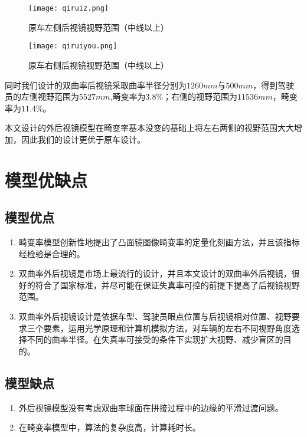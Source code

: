 \documentclass[withoutpreface,bwprint]{cumcmthesis} %
\begin{document}
\begin{figure}[!htbp]  
\begin{minipage}[t]{0.5\textwidth}
\centering  
\texttt{[image: qiruiz.png]}
\caption{原车左侧后视镜视野范围（中线以上）} \label{fig:qiruiz}\end{minipage}
\hspace{1ex}
\begin{minipage}[t]{0.5\textwidth}  
\centering  
\texttt{[image: qiruiyou.png]}
\caption{原车右侧后视镜视野范围（中线以上）} \label{fig:qiruiy}
\end{minipage}  
\end{figure} 

 
\par 同时我们设计的双曲率后视镜采取曲率半径分别为$1260mm$与$500mm$，得到驾驶员的左侧视野范围为$5527mm$,畸变率为$3.8\%$；右侧的视野范围为$11536 mm$，畸变率为$11.4\%$。

\par 本文设计的外后视镜模型在畸变率基本没变的基础上将左右两侧的视野范围大大增加，因此我们的设计更优于原车设计。


\section{模型优缺点}
\subsection{模型优点}
\begin{enumerate}
	\item 畸变率模型创新性地提出了凸面镜图像畸变率的定量化刻画方法，并且该指标经检验是合理的。
	\item 双曲率外后视镜是市场上最流行的设计，并且本文设计的双曲率外后视镜，很好的符合了国家标准，并尽可能在保证失真率可控的前提下提高了后视镜视野范围。
	\item 双曲率外后视镜设计是依据车型、驾驶员眼点位置与后视镜相对位置、视野要求三个要素，运用光学原理和计算机模拟方法，对车辆的左右不同视野角度选择不同的曲率半径。在失真率可接受的条件下实现扩大视野、减少盲区的目的。
\end{enumerate}
\subsection{模型缺点}
\begin{enumerate}
	\item 外后视镜模型没有考虑双曲率球面在拼接过程中的边缘的平滑过渡问题。
	\item 在畸变率模型中，算法的复杂度高，计算耗时长。
\end{enumerate}
\end{document}

